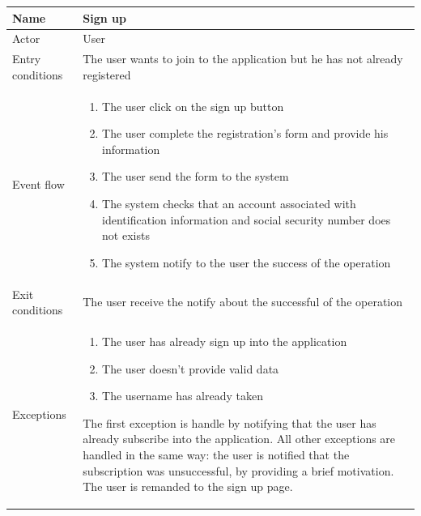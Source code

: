 \begin{table}[H]
\begin{tabularx}{\textwidth}{|l|X|}
\hline
 Name & Sign up \\ \hline
 Actor & User \\ \hline
 Entry conditions & The user wants to join to the application but he has not already registered \\ \hline
 Event flow & 
 \begin{enumerate}
 	\item The user click on the sign up button
  	\item The user complete the registration's form and provide his information
 	\item The user send the form to the system
 	\item The system checks that an account associated with identification information and social security number does not exists
 	\item The system notify to the user the success of the operation
 \end{enumerate}   \\ \hline
 Exit conditions & The user receive the notify about the successful of the operation \\ \hline
 Exceptions &  
 \begin{enumerate}
 	\item The user has already sign up into the application
 	\item The user doesn't provide valid data 
 	\item The username has already taken 
 \end{enumerate}
 The first exception is handle by notifying that the user has already subscribe into the application.
 All other exceptions are handled in the same way: the user is notified that the subscription was unsuccessful, by providing a brief motivation. The user is remanded to the sign up page.  
 \\ \hline
\end{tabularx}
\end{table}


